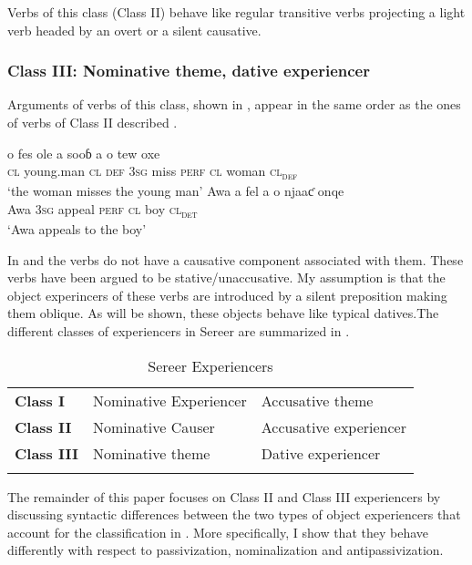 \documentclass[output=paper]{langscibook}
\begin{document}
Verbs of this class (Class II) behave like regular transitive verbs projecting a light verb headed by an overt or a silent causative.

\subsubsection{Class III: Nominative theme, dative experiencer}

Arguments of verbs of this class, shown in , appear in the same order as the ones of verbs of Class II described .

\ea \label{ex:tamba:7}
\ea \label{ex:tamba:7a}
\gll o  fes              ole         a          sooɓ  a        o  tew        oxe\\
    \textsc{cl} young.man  \textsc{cl\textsubscript{} \textsc{def}}    \textsc{3sg}       miss  \textsc{perf}   \textsc{cl}  woman \textsc{cl\textsubscript{def}}\\
\glt `the woman  misses the young man'
\ex \label{ex:tamba:7b}
\gll Awa a     fel         a       o     njaaƈ onqe\\
Awa \textsc{3sg} appeal \textsc{perf}  \textsc{cl}   boy   \textsc{cl\textsubscript{det} }\\
\glt `Awa appeals to the boy'
\z
\z

In  and  the verbs do not have a causative component associated with them. These verbs have been argued to be stative/unaccusative. My assumption is that the object experincers of these verbs are introduced by a silent preposition making them oblique. As will be shown, these objects behave like typical datives.The different classes of experiencers in Sereer are summarized in .
 
\begin{table}
\caption{Sereer Experiencers}
\label{tab:tamba:2}
\begin{tabular}{lll}
\lsptoprule
\textbf{Class I} & Nominative Experiencer & Accusative theme\\
\textbf{Class II} & Nominative Causer & Accusative experiencer\\
\textbf{Class III} & Nominative theme & Dative experiencer\\
\lspbottomrule
\end{tabular}
\end{table}

The remainder of this paper focuses on Class II and Class III experiencers by discussing syntactic differences between the two types of object experiencers that account for the classification in . More specifically, I show that they behave differently with respect to passivization, nominalization and antipassivization.
\end{document}
